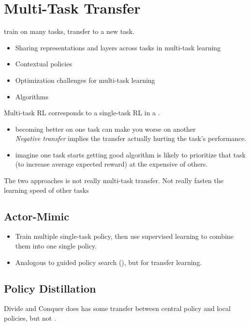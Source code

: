 \section{Multi-Task Transfer}
 train on many tasks, transfer to a new task.
\begin{itemize}
	\item Sharing representations and layers across tasks in multi-task learning
	\item Contextual policies
	\item Optimization challenges for multi-task learning
	\item Algorithms
\end{itemize}

Multi-task \ac{RL} corresponds to a single-task \ac{RL} in a .

\begin{itemize}
	\item {} becoming better on one task can make you worse on another\\
	\textit{Negative transfer} implies the transfer actually hurting the task's performance.
	\item {} imagine one task starts getting good algorithm is likely to prioritize that task (to increase average expected reward) at the expensive of others.
\end{itemize}

The two approaches is not really multi-task transfer. Not really fasten the learning speed of other tasks
\subsection{Actor-Mimic}
\begin{itemize}
	\item Train multiple single-task policy, then use supervised learning to combine them into one single policy. \cite{rusu2015policy}
	\item Analogous to guided policy search (), but for transfer learning. \cite{levine2013icml}
\end{itemize}

\subsection{Policy Distillation}
Divide and Conquer does has some transfer between central policy and local policies, but not . \cite{parisotto2015actor}

